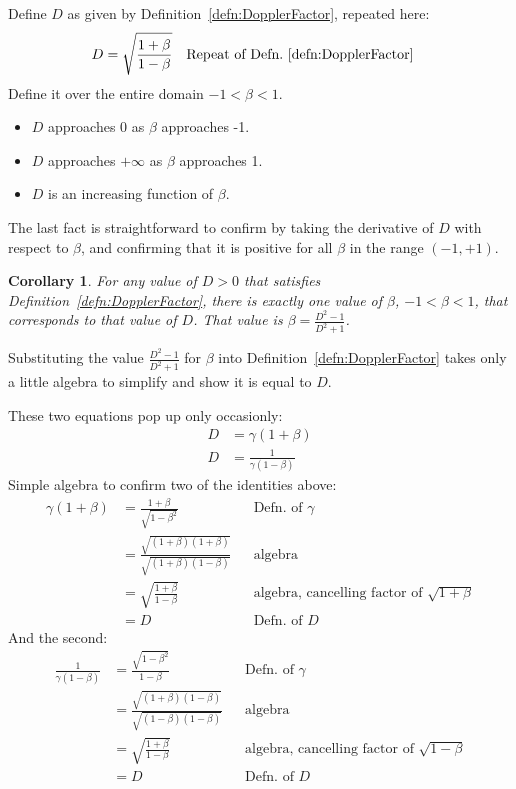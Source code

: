 \documentclass[a4paper]{article}
\theoremstyle{plain}
\newtheorem{corollary}[theorem]{Corollary}
\theoremstyle{definition}
\begin{document}
Define $D$ as given by Definition~\eqref{defn:DopplerFactor}, repeated
here:
\begin{align*}
D & = \sqrt{ \frac{1 + \beta}{1 - \beta} } & & \text{Repeat of Defn.~\eqref{defn:DopplerFactor}}
\end{align*}
Define it over the entire domain $-1 < \beta < 1$.
\begin{itemize}
\item $D$ approaches 0 as $\beta$ approaches -1.
\item $D$ approaches $+\infty$ as $\beta$ approaches 1.
\item $D$ is an increasing function of $\beta$.
\end{itemize}
The last fact is straightforward to confirm by taking the derivative
of $D$ with respect to $\beta$, and confirming that it is positive
for all $\beta$ in the range $(-1, +1)$.

\begin{corollary}
\label{cor:DdeterminesBeta}
For any value of $D > 0$ that satisfies
Definition~\eqref{defn:DopplerFactor}, there is exactly one value of
$\beta$, $-1 < \beta < 1$,
that corresponds to that value of $D$.
That value is $\beta = \frac{D^2-1}{D^2+1}$.
\end{corollary}
Substituting the value $\frac{D^2-1}{D^2+1}$ for $\beta$ into
Definition~\eqref{defn:DopplerFactor} takes only a little
algebra to simplify and show it is equal to $D$.

These two equations pop up only occasionly:
\begin{align}
D & = \gamma (1+\beta) \label{eqn:Dgammabeta1} \\
D & = \frac{1}{\gamma (1-\beta)} \label{eqn:Dgammabeta2}
\end{align}
Simple algebra to confirm two of the identities above:
\begin{align*}
\gamma (1+\beta)
  & = \frac{1+\beta}{\sqrt{1-\beta^2}} & & \text{Defn. of $\gamma$} \\
  & = \frac{\sqrt{(1+\beta)(1+\beta)}}{\sqrt{(1+\beta)(1-\beta)}} & & \text{algebra} \\
  & = \sqrt{ \frac{1+\beta}{1-\beta} } & & \text{algebra, cancelling factor of $\sqrt{1+\beta}$} \\
  & = D & & \text{Defn. of $D$}
\end{align*}
And the second:
\begin{align*}
\frac{1}{\gamma (1-\beta)}
  & = \frac{\sqrt{1-\beta^2}}{1-\beta} & & \text{Defn. of $\gamma$} \\
  & = \frac{\sqrt{(1+\beta)(1-\beta)}}{\sqrt{(1-\beta)(1-\beta)}} & & \text{algebra} \\
  & = \sqrt{ \frac{1+\beta}{1-\beta} } & & \text{algebra, cancelling factor of $\sqrt{1-\beta}$} \\
  & = D & & \text{Defn. of $D$}
\end{align*}
\end{document}

